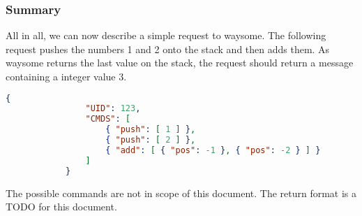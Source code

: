     \subsubsection{Summary}

        All in all, we can now describe a simple request to waysome. The
        following request pushes the numbers 1 and 2 onto the stack and then
        adds them. As waysome returns the last value on the stack, the request
        should return a message containing a integer value 3.

        \begin{lstlisting}[language=json]
            {
                "UID": 123,
                "CMDS": [
                    { "push": [ 1 ] },
                    { "push": [ 2 ] },
                    { "add": [ { "pos": -1 }, { "pos": -2 } ] }
                ]
            }
        \end{lstlisting}

        The possible commands are not in scope of this document.
        The return format is a TODO for this document.
